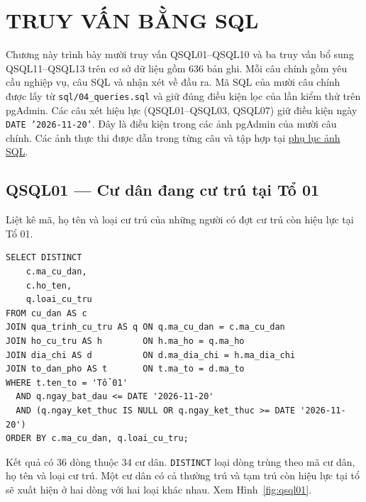 \section{TRUY VẤN BẰNG SQL}
\label{sec:chuong5}

Chương này trình bày mười truy vấn QSQL01--QSQL10 và ba truy vấn bổ sung QSQL11--QSQL13 trên cơ sở dữ liệu gồm 636 bản ghi. Mỗi câu chính gồm yêu cầu nghiệp vụ, câu SQL và nhận xét về đầu ra. Mã SQL của mười câu chính được lấy từ \texttt{sql/04\_queries.sql} và giữ đúng điều kiện lọc của lần kiểm thử trên pgAdmin. Các câu xét hiệu lực (QSQL01--QSQL03, QSQL07) giữ điều kiện ngày \texttt{DATE '2026-11-20'}. Đây là điều kiện trong các ảnh pgAdmin của mười câu chính. Các ảnh thực thi được dẫn trong từng câu và tập hợp tại \hyperref[sec:anhqsql]{phụ lục ảnh SQL}.\par\medskip

\noindent\begin{minipage}{\linewidth}
\subsection*{QSQL01 --- Cư dân đang cư trú tại Tổ 01}

Liệt kê mã, họ tên và loại cư trú của những người có đợt cư trú còn hiệu lực tại Tổ 01.

\begin{lstlisting}[style=sqlvn]
SELECT DISTINCT
    c.ma_cu_dan,
    c.ho_ten,
    q.loai_cu_tru
FROM cu_dan AS c
JOIN qua_trinh_cu_tru AS q ON q.ma_cu_dan = c.ma_cu_dan
JOIN ho_cu_tru AS h        ON h.ma_ho = q.ma_ho
JOIN dia_chi AS d          ON d.ma_dia_chi = h.ma_dia_chi
JOIN to_dan_pho AS t       ON t.ma_to = d.ma_to
WHERE t.ten_to = 'Tổ 01'
  AND q.ngay_bat_dau <= DATE '2026-11-20'
  AND (q.ngay_ket_thuc IS NULL OR q.ngay_ket_thuc >= DATE '2026-11-20')
ORDER BY c.ma_cu_dan, q.loai_cu_tru;
\end{lstlisting}

Kết quả có 36 dòng thuộc 34 cư dân. \texttt{DISTINCT} loại dòng trùng theo mã cư dân, họ tên và loại cư trú. Một cư dân có cả thường trú và tạm trú còn hiệu lực tại tổ sẽ xuất hiện ở hai dòng với hai loại khác nhau. Xem Hình~\ref{fig:qsql01}.
\end{minipage}\par\medskip

